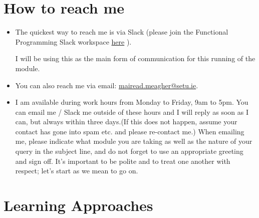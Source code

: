 \documentclass{article}
\begin{document}
\section{How to reach me}
\begin{itemize}
    \item The quickest way to reach me is via Slack (please join the Functional Programming  Slack workspace  
    \href{https://join.slack.com/t/funprog24/shared_invite/zt-2aly9cbup-0ZIces2WFd9thc9DpCvkLw}{here} ).  

    I will be using  this  as the main form of communication for this running of the module. 

    \item You can also reach me via email: \href{mailto:mairead.meagher@setu.ie}{mairead.meagher@setu.ie}. 
    \item I am available during work hours from Monday to Friday, 9am to 5pm. You can email me / Slack me outside 
    of these hours and I will reply as soon as I can, 
but always within three days.(If this does not happen, assume your contact has gone into spam etc. and please re-contact me.) 
When emailing me, please indicate what module you are taking as well as the nature of your query in the 
subject line, and do not forget to use an appropriate greeting and sign off. 
It’s important to be polite and to treat one another with 
respect; let’s start as we mean to go on.
\end{itemize}
\pagebreak
\section{Learning Approaches}
\end{document}
